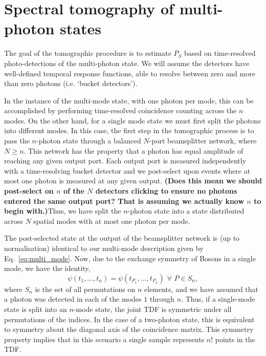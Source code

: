 \documentclass[aps,pra,twocolumn,amsmath,amssymb,color,superscriptaddress]{revtex4}
\begin{document}
%
%

\section{Spectral tomography of multi-photon states}

The goal of the tomographic procedure is to estimate $P_S$ based on time-resolved photo-detections of the multi-photon state. We will assume the detectors have well-defined temporal response functions, able to resolve between zero and more than zero photons (i.e. `bucket detectors').

In the instance of the multi-mode state, with one photon per mode, this can be accomplished by performing time-resolved coincidence counting across the $n$ modes. On the other hand, for a single mode state we must first split the photons into different modes. In this case, the first step in the tomographic process is to pass the $n$-photon state through a balanced $N$-port beamsplitter network, where \mbox{$N\geq n$}. This network has the property that a photon has equal amplitude of reaching any given output port. Each output port is measured independently with a time-resolving bucket detector and we post-select upon events where at most one photon is measured at any given output. \textbf{(Does this mean we should post-select on $n$ of the $N$ detectors clicking to ensure no photons entered the same output port? That is assuming we actually know $n$ to begin with.)}Thus, we have split the $n$-photon state into a state distributed across $N$ spatial modes with at most one photon per mode.

The post-selected state at the output of the beamsplitter network is (up to normalisation) identical to our multi-mode description given by Eq.~\ref{eq:multi_mode}. Now, due to the exchange symmetry of Bosons in a single mode, we have the identity,
\begin{equation}
\psi(t_1,\dots,t_n) = \psi(t_{P_1},\dots,t_{P_n})\,\,\forall\,\,P\in S_n,
\end{equation}
where $S_n$ is the set of all permutations on $n$ elements, and we have assumed that a photon was detected in each of the modes $1$ through $n$. Thus, if a single-mode state is split into an $n$-mode state, the joint TDF is symmetric under all permutations of the indices. In the case of a two-photon state, this is equivalent to symmetry about the diagonal axis of the coincidence matrix. This symmetry property implies that in this scenario a single sample represents $n!$ points in the TDF.
\end{document}
